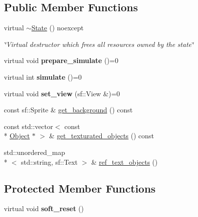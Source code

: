 \subsection*{Public Member Functions}
\begin{DoxyCompactItemize}
\item 
\hypertarget{classState_a591f523d68d09675b3bd6f8e1084e642}{virtual \hyperlink{classState_a591f523d68d09675b3bd6f8e1084e642}{$\sim$\+State} () noexcept}\label{classState_a591f523d68d09675b3bd6f8e1084e642}

\begin{DoxyCompactList}\small\item\em \char`\"{}\+Virtual destructor which frees all resources owned by the state\char`\"{} \end{DoxyCompactList}\item 
\hypertarget{classState_af0cf4ef9c4b4e9a22dacf949f3df8cea}{virtual void {\bfseries prepare\+\_\+simulate} ()=0}\label{classState_af0cf4ef9c4b4e9a22dacf949f3df8cea}

\item 
\hypertarget{classState_a2fd001147b34d4a07102ba0acf680982}{virtual int {\bfseries simulate} ()=0}\label{classState_a2fd001147b34d4a07102ba0acf680982}

\item 
\hypertarget{classState_aacfda33b8dc4e6d39febdb192270a85a}{virtual void {\bfseries set\+\_\+view} (sf\+::\+View \&)=0}\label{classState_aacfda33b8dc4e6d39febdb192270a85a}

\item 
const sf\+::\+Sprite \& \hyperlink{classState_a9e132079dc08365e3c30633dd002ab8c}{get\+\_\+background} () const 
\item 
const std\+::vector$<$ const \\*
\hyperlink{classObject}{Object} $\ast$ $>$ \& \hyperlink{classState_aa234d5b01d5f75580825ea0e38074482}{get\+\_\+texturated\+\_\+objects} () const 
\item 
std\+::unordered\+\_\+map\\*
$<$ std\+::string, sf\+::\+Text $>$ \& \hyperlink{classState_a38fe48726722d318d346608f4f947121}{ref\+\_\+text\+\_\+objects} ()
\end{DoxyCompactItemize}
\subsection*{Protected Member Functions}
\begin{DoxyCompactItemize}
\item 
\hypertarget{classState_a2ebdd6e26d78ad2d34a8bf14ddb7ccf3}{virtual void {\bfseries soft\+\_\+reset} ()}\label{classState_a2ebdd6e26d78ad2d34a8bf14ddb7ccf3}

\end{DoxyCompactItemize}
